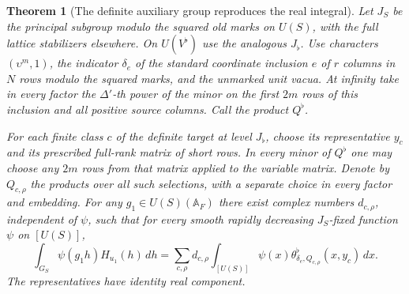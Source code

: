 \documentclass[a4paper,11pt]{article}
\newtheorem{theorem}[proposition]{Theorem}
\theoremstyle{definition}
\theoremstyle{remark}
\numberwithin{equation}{section}
\begin{document}
\begin{theorem}[The definite auxiliary group reproduces the real integral]
\leavevmode\label{thm:flatreproduce816}
Let \(J_S\) be the principal subgroup modulo the squared
old marks on \(U(S)\), with the full lattice stabilizers
elsewhere. On \(U(V^\flat)\) use the analogous \(J_\flat\).
Use characters \((\upsilon^m,1)\), the indicator \(\delta_e\)
of the standard coordinate inclusion \(e\) of \(r\) columns
in \(N\) rows modulo the squared marks, and the unmarked
unit vacua. At infinity take in every factor the
\(\Delta'\)-th power of the minor on the first \(2m\)
rows of this inclusion and all positive source columns.
Call the product \(Q^\flat\).

For each finite class \(c\) of the definite target at
level \(J_\flat\), choose its representative \(y_c\) and
its prescribed full-rank matrix of short rows. In every
minor of \(Q^\flat\) one may choose any \(2m\) rows from
that matrix applied to the variable matrix. Denote by
\(Q_{c,\rho}\) the products over all such selections,
with a separate choice in every factor and embedding.
For any \(g_1\in U(S)(\mathbb A_F)\) there exist complex
numbers \(d_{c,\rho}\), independent of \(\psi\), such that
for every smooth rapidly decreasing \(J_S\)-fixed function
\(\psi\) on \([U(S)]\),
\[
 \int_{G_S}\psi(g_1h)H_{u_1}(h)\,dh
 =
 \sum_{c,\rho}d_{c,\rho}\int_{[U(S)]}
       \psi(x)\theta^\flat_{\delta_e,Q_{c,\rho}}(x,y_c)\,dx .
\]
The representatives have identity real component.
\end{theorem}
\end{document}
